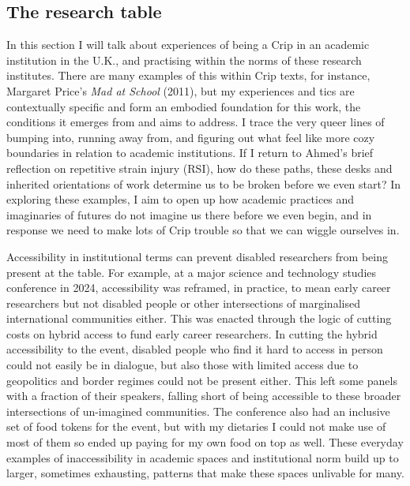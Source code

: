 \hypertarget{the-research-table}{%
\subsection[The research
table]{\texorpdfstring{\protect\hypertarget{anchor}{}{}The research
table}{The research table}}\label{the-research-table}}

In this section I will talk about experiences of being a Crip in an
academic institution in the U.K., and practising within the norms of
these research institutes. There are many examples of this within Crip
texts, for instance, Margaret Price's \emph{Mad at School} (2011), but
my experiences and tics are contextually specific and form an embodied
foundation for this work, the conditions it emerges from and aims to
address. I trace the very queer lines of bumping into, running away
from, and figuring out what feel like more cozy boundaries in relation
to academic institutions. If I return to Ahmed's brief reflection on
repetitive strain injury (RSI), how do these paths, these desks and
inherited orientations of work determine us to be broken before we even
start? In exploring these examples, I aim to open up how academic
practices and imaginaries of futures do not imagine us there before we
even begin, and in response we need to make lots of Crip trouble so that
we can wiggle ourselves in.

Accessibility in institutional terms can prevent disabled researchers
from being present at the table. For example, at a major science and
technology studies conference in 2024, accessibility was reframed, in
practice, to mean early career researchers but not disabled people or
other intersections of marginalised international communities either.
This was enacted through the logic of cutting costs on hybrid access to
fund early career researchers. In cutting the hybrid accessibility to
the event, disabled people who find it hard to access in person could
not easily be in dialogue, but also those with limited access due to
geopolitics and border regimes could not be present either. This left
some panels with a fraction of their speakers, falling short of being
accessible to these broader intersections of un-imagined communities.
The conference also had an inclusive set of food tokens for the event,
but with my dietaries I could not make use of most of them so ended up
paying for my own food on top as well. These everyday examples of
inaccessibility in academic spaces and institutional norm build up to
larger, sometimes exhausting, patterns that make these spaces unlivable
for many.

